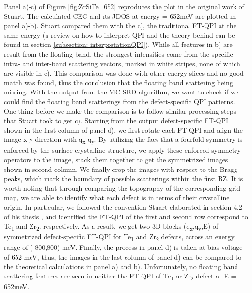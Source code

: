 Panel a)-c) of Figure \ref{fig:ZrSiTe_652} reproduces the plot in the original work of Stuart\cite{stuartScanningTunnellingMicroscopy2021}. The calculated \ac{CEC} and its \ac{JDOS} at energy = 652meV are plotted in panel a)-b). Stuart compared them with the c), the traditional FT-QPI at the same energy (a review on how to interpret QPI and the theory behind can be found in section \ref{subsection: interpretationQPI}). While all features in b) are result from the floating band, the strongest intensities come from the specific intra- and inter-band scattering vectors, marked in white stripes, none of which are visible in c). This comparison was done with other energy slices and no good match was found, thus the conclusion that the floating band scattering being missing. With the output from the \ac{MC-SBD} algorithm, we want to check if we could find the floating band scatterings from the defect-specific QPI patterns. One thing before we make the comparison is to follow similar processing steps that Stuart took to get c). Starting from the output defect-specific FT-QPI shown in the first column of panel d), we first rotate each FT-QPI and align the image x-y direction with q\textsubscript{x}-q\textsubscript{y}. By utilizing the fact that a fourfold symmetry is enforced by the surface crystalline structure, we apply these enforced symmetry operators to the image, stack them together to get the symmetrized images shown in second column. We finally crop the images with respect to the Bragg peaks, which mark the boundary of possible scatterings within the first \ac{BZ}. It is worth noting that through comparing the topography of the corresponding grid map, we are able to identify what each defect is in terms of their crystalline origin. In particular, we followed the convention Stuart elaborated in section 4.2 of his thesis \cite{stuartScanningTunnellingMicroscopy2021}, and identified the FT-QPI of the first and second row correspond to Te\textsubscript{1} and Zr\textsubscript{2}. respectively. As a result, we get two 3D blocks (q\textsubscript{x},q\textsubscript{y},E) of symmetrized defect-specific FT-QPI for Te\textsubscript{1} and Zr\textsubscript{2} defects, across an energy range of (-800,800) meV. Finally, the process in panel d) is taken at bias voltage of 652 meV, thus, the images in the last column of panel d) can be compared to the theoretical calculations in panel a) and b). Unfortunately, no floating band scattering features are seen in neither the FT-QPI of Te\textsubscript{1} or Zr\textsubscript{2} defect at E = 652meV. 


